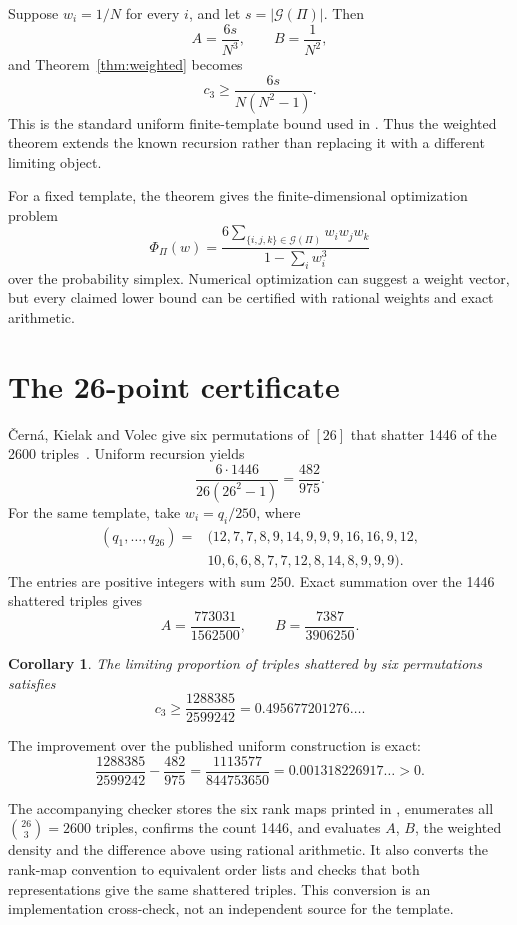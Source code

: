 \documentclass[11pt]{article}
\newtheorem{corollary}[theorem]{Corollary}
\newcommand{\shat}{\mathcal{G}}
\begin{document}
Suppose $w_i=1/N$ for every $i$, and let $s=|\shat(\Pi)|$.  Then
\[
A=\frac{6s}{N^3},
\qquad
B=\frac1{N^2},
\]
and Theorem~\ref{thm:weighted} becomes
\[
c_3\ge\frac{6s}{N(N^2-1)}.
\]
This is the standard uniform finite-template bound used in
\cite{johnson-wickes,cerna-kielak-volec}.  Thus the weighted theorem extends
the known recursion rather than replacing it with a different limiting
object.

For a fixed template, the theorem gives the finite-dimensional optimization
problem
\[
\Phi_{\Pi}(w)
=\frac{6\sum_{\{i,j,k\}\in\shat(\Pi)}w_iw_jw_k}
{1-\sum_iw_i^3}
\]
over the probability simplex.  Numerical optimization can suggest a weight
vector, but every claimed lower bound can be certified with rational weights
and exact arithmetic.

\section{The 26-point certificate}

\v{C}ern\'a, Kielak and Volec give six permutations of $[26]$ that shatter
1446 of the 2600 triples~\cite[Table~2]{cerna-kielak-volec}.  Uniform
recursion yields
\[
\frac{6\cdot1446}{26(26^2-1)}=\frac{482}{975}.
\]
For the same template, take $w_i=q_i/250$, where
\[
\begin{aligned}
(q_1,\ldots,q_{26})={}&(12,7,7,8,9,14,9,9,9,16,16,9,12,\\
&10,6,6,8,7,7,12,8,14,8,9,9,9).
\end{aligned}
\]
The entries are positive integers with sum 250.  Exact summation over the
1446 shattered triples gives
\[
A=\frac{773031}{1562500},
\qquad
B=\frac{7387}{3906250}.
\]

\begin{corollary}\label{cor:new-bound}
The limiting proportion of triples shattered by six permutations satisfies
\[
\boxed{
c_3\ge\frac{1288385}{2599242}
=0.495677201276\ldots }.
\]
\end{corollary}

The improvement over the published uniform construction is exact:
\[
\frac{1288385}{2599242}-\frac{482}{975}
=\frac{1113577}{844753650}
=0.001318226917\ldots>0.
\]

The accompanying checker stores the six rank maps printed in
\cite{cerna-kielak-volec}, enumerates all $\binom{26}{3}=2600$ triples,
confirms the count 1446, and evaluates $A$, $B$, the weighted density and the
difference above using rational arithmetic.  It also converts the rank-map
convention to equivalent order lists and checks that both representations
give the same shattered triples.  This conversion is an implementation
cross-check, not an independent source for the template.
\end{document}
